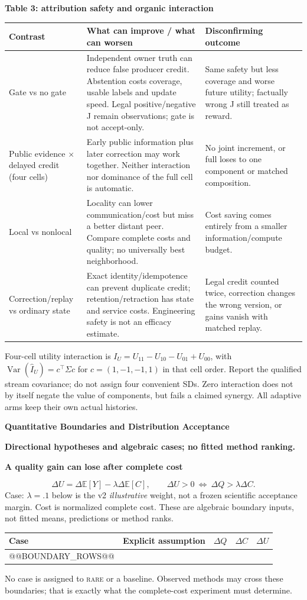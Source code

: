 \documentclass[10pt,a4paper]{article}
\newcommand{\lead}[1]{\vspace{4pt}\textbf{#1}\par}
\newcommand{\rare}{\textsc{rare}}
\newcommand{\caution}{\textcolor{red!70!black}{\textbf{Directional hypotheses and algebraic cases; no fitted method ranking.}}\par}
\begin{document}
\lead{Table 3: attribution safety and organic interaction}
\begin{center}\small
\begin{tabularx}{\linewidth}{@{}L{.23\linewidth}X L{.25\linewidth}@{}}\toprule
Contrast & What can improve / what can worsen & Disconfirming outcome\\\midrule
Gate vs no gate & Independent owner truth can reduce false producer credit. Abstention costs coverage, usable labels and update speed. Legal positive/negative J remain observations; gate is not accept-only. & Same safety but less coverage and worse future utility; factually wrong J still treated as reward.\\
Public evidence $\times$ delayed credit (four cells) & Early public information plus later correction may work together. Neither interaction nor dominance of the full cell is automatic. & No joint increment, or full loses to one component or matched composition.\\
Local vs nonlocal & Locality can lower communication/cost but miss a better distant peer. Compare complete costs and quality; no universally best neighborhood. & Cost saving comes entirely from a smaller information/compute budget.\\
Correction/replay vs ordinary state & Exact identity/idempotence can prevent duplicate credit; retention/retraction has state and service costs. Engineering safety is not an efficacy estimate. & Legal credit counted twice, correction changes the wrong version, or gains vanish with matched replay.\\\bottomrule
\end{tabularx}\end{center}
Four-cell utility interaction is $I_U=U_{11}-U_{10}-U_{01}+U_{00}$, with
$\operatorname{Var}(\widehat I_U)=c^\top\Sigma c$ for $c=(1,-1,-1,1)$ in that
cell order. Report the qualified stream covariance; do not assign four convenient
SDs. Zero interaction does not by itself negate the value of components, but
fails a claimed synergy. All adaptive arms keep their own actual histories.

\clearpage
{\large\bfseries Quantitative Boundaries and Distribution Acceptance}\par\caution
\lead{A quality gain can lose after complete cost}
\[
 \Delta U=\Delta\mathbb E[Y]-\lambda\Delta\mathbb E[C],\qquad
 \Delta U>0\ \Longleftrightarrow\ \Delta Q>\lambda\Delta C.
\]
Case: $\lambda=.1$ below is the v2 \emph{illustrative} weight, not a frozen
scientific acceptance margin. Cost is normalized complete cost. These are
algebraic boundary inputs, not fitted means, predictions or method ranks.
\begin{center}\small
\begin{tabularx}{\linewidth}{@{}lXrrr@{}}\toprule
Case & Explicit assumption & $\Delta Q$ & $\Delta C$ & $\Delta U$\\\midrule
@@BOUNDARY_ROWS@@
\bottomrule\end{tabularx}\end{center}
No case is assigned to \rare{} or a baseline. Observed methods may cross these
boundaries; that is exactly what the complete-cost experiment must determine.
\end{document}
